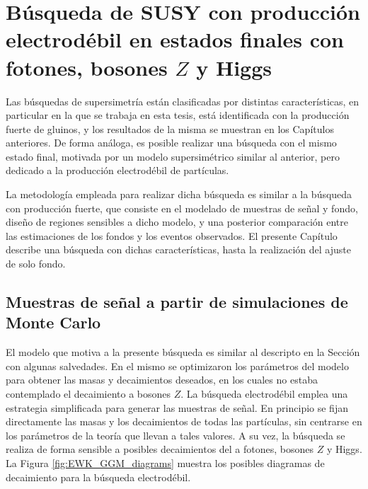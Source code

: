 \chapter{Búsqueda de SUSY con producción electrodébil en estados finales con fotones, bosones $Z$ y Higgs}\label{cap:analysis_EWK}

Las búsquedas de supersimetría están clasificadas por distintas características, en particular en la que se trabaja en esta tesis, está identificada con la producción fuerte de gluinos, y los resultados de la misma se muestran en los Capítulos anteriores. De forma análoga, es posible realizar una búsqueda con el mismo estado final, motivada por un modelo supersimétrico similar al anterior, pero dedicado a la producción electrodébil de partículas.

La metodología empleada para realizar dicha búsqueda es similar a la búsqueda con producción fuerte, que consiste en el modelado de muestras de señal y fondo, diseño de regiones sensibles a dicho modelo, y una posterior comparación entre las estimaciones de los fondos y los eventos observados. El presente Capítulo describe una búsqueda con dichas características, hasta la realización del ajuste de solo fondo.


\section{Muestras de señal a partir de simulaciones de Monte Carlo}

El modelo que motiva a la presente búsqueda es similar al descripto en la Sección \label{sec:signal_samples} con algunas salvedades. En el mismo se optimizaron los parámetros del modelo para obtener las masas y decaimientos deseados, en los cuales no estaba contemplado el decaimiento a bosones $Z$. La búsqueda electrodébil emplea una estrategia simplificada para generar las muestras de señal. En principio se fijan directamente las masas y los decaimientos de todas las partículas, sin centrarse en los parámetros de la teoría que llevan a tales valores. A su vez, la búsqueda se realiza de forma sensible a posibles decaimientos del \ninoone a fotones, bosones $Z$ y Higgs. La Figura \ref{fig:EWK_GGM_diagrams} muestra los posibles diagramas de decaimiento para la búsqueda electrodébil.


